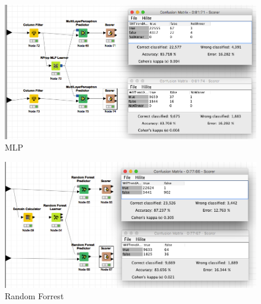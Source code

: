\documentclass[a4paper]{article}
\theoremstyle{definition}
\begin{document}
\begin{figure}[h!]
\begin{center}
    \includegraphics[width=1\textwidth]{MLP.png}
    \caption{MLP}
\end{center}
\label{fig:MLP}
\end{figure}

\begin{figure}[h!]
\begin{center}
    \includegraphics[width=1\textwidth]{Random_Forrest.png}
    \caption{Random Forrest}
\end{center}
\label{fig:randomForrest}
\end{figure}

\end{document}
